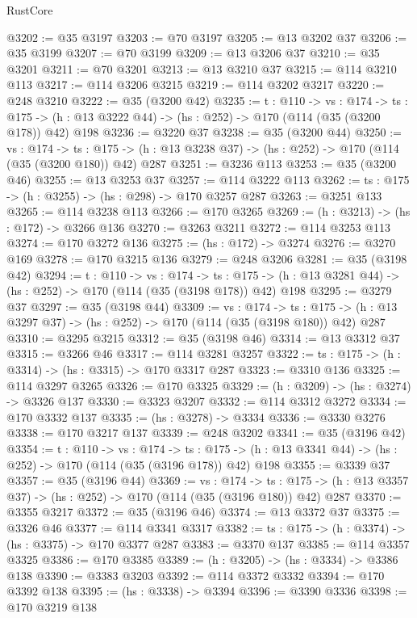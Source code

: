 \begin{lexlean}{RustCore}
\begin{coremodule}
@3202 := @35 @3197
@3203 := @70 @3197
@3205 := @13 @3202 @37
@3206 := @35 @3199
@3207 := @70 @3199
@3209 := @13 @3206 @37
@3210 := @35 @3201
@3211 := @70 @3201
@3213 := @13 @3210 @37
@3215 := @114 @3210 @113
@3217 := @114 @3206 @3215
@3219 := @114 @3202 @3217
@3220 := @248 @3210
@3222 := @35 (@3200 @42)
@3235 := {t : @110} ->
  {vs : @174} ->
  {ts : @175} -> (h : @13 @3222 @44) -> (hs : @252) -> @170 (@114 (@35 (@3200 @178)) @42) @198
@3236 := @3220 @37
@3238 := @35 (@3200 @44)
@3250 := {vs : @174} ->
  {ts : @175} -> (h : @13 @3238 @37) -> (hs : @252) -> @170 (@114 (@35 (@3200 @180)) @42) @287
@3251 := @3236 @113
@3253 := @35 (@3200 @46)
@3255 := @13 @3253 @37
@3257 := @114 @3222 @113
@3262 := {ts : @175} -> (h : @3255) -> (hs : @298) -> @170 @3257 @287
@3263 := @3251 @133
@3265 := @114 @3238 @113
@3266 := @170 @3265
@3269 := (h : @3213) -> (hs : @172) -> @3266 @136
@3270 := @3263 @3211
@3272 := @114 @3253 @113
@3274 := @170 @3272 @136
@3275 := (hs : @172) -> @3274
@3276 := @3270 @169
@3278 := @170 @3215 @136
@3279 := @248 @3206
@3281 := @35 (@3198 @42)
@3294 := {t : @110} ->
  {vs : @174} ->
  {ts : @175} -> (h : @13 @3281 @44) -> (hs : @252) -> @170 (@114 (@35 (@3198 @178)) @42) @198
@3295 := @3279 @37
@3297 := @35 (@3198 @44)
@3309 := {vs : @174} ->
  {ts : @175} -> (h : @13 @3297 @37) -> (hs : @252) -> @170 (@114 (@35 (@3198 @180)) @42) @287
@3310 := @3295 @3215
@3312 := @35 (@3198 @46)
@3314 := @13 @3312 @37
@3315 := @3266 @46
@3317 := @114 @3281 @3257
@3322 := {ts : @175} -> (h : @3314) -> (hs : @3315) -> @170 @3317 @287
@3323 := @3310 @136
@3325 := @114 @3297 @3265
@3326 := @170 @3325
@3329 := (h : @3209) -> (hs : @3274) -> @3326 @137
@3330 := @3323 @3207
@3332 := @114 @3312 @3272
@3334 := @170 @3332 @137
@3335 := (hs : @3278) -> @3334
@3336 := @3330 @3276
@3338 := @170 @3217 @137
@3339 := @248 @3202
@3341 := @35 (@3196 @42)
@3354 := {t : @110} ->
  {vs : @174} ->
  {ts : @175} -> (h : @13 @3341 @44) -> (hs : @252) -> @170 (@114 (@35 (@3196 @178)) @42) @198
@3355 := @3339 @37
@3357 := @35 (@3196 @44)
@3369 := {vs : @174} ->
  {ts : @175} -> (h : @13 @3357 @37) -> (hs : @252) -> @170 (@114 (@35 (@3196 @180)) @42) @287
@3370 := @3355 @3217
@3372 := @35 (@3196 @46)
@3374 := @13 @3372 @37
@3375 := @3326 @46
@3377 := @114 @3341 @3317
@3382 := {ts : @175} -> (h : @3374) -> (hs : @3375) -> @170 @3377 @287
@3383 := @3370 @137
@3385 := @114 @3357 @3325
@3386 := @170 @3385
@3389 := (h : @3205) -> (hs : @3334) -> @3386 @138
@3390 := @3383 @3203
@3392 := @114 @3372 @3332
@3394 := @170 @3392 @138
@3395 := (hs : @3338) -> @3394
@3396 := @3390 @3336
@3398 := @170 @3219 @138

\end{coremodule}
\end{lexlean}
